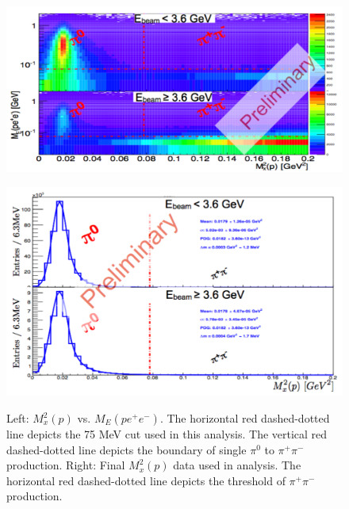 \documentclass{aip-cp}
\begin{document}
\begin{figure}[h!]
	\centering
	\begin{minipage}{.50\textwidth}
		\centering
		\includegraphics[width=225 pt, height = 150 pt]{figures/pi0_ME_vs_Mx.pdf}
		\caption{}{}
		\label{fig:Mx_ME}
	\end{minipage}%
	\centering
	\begin{minipage}{.50\textwidth}
		\centering
		\includegraphics[width=225 pt, height = 150 pt]{figures/pi0_spectrum.pdf}
		\caption{Left: $M_x^2 (p)$ vs. $M_E(pe^+e^-)$. The horizontal red dashed-dotted line depicts the 75 MeV cut used in this analysis. The vertical red dashed-dotted line depicts the boundary of single $\pi^0$ to $\pi^{+}\pi^{-}$ production. Right: Final $M_x^2(p)$ data used in analysis. The horizontal red dashed-dotted line depicts the threshold of $\pi^{+}\pi^{-}$ production.}{}
		\label{fig:Mxp}
	\end{minipage}
\end{figure}
\end{document}
